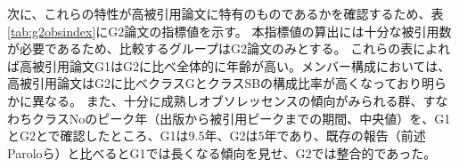 次に、これらの特性が高被引用論文に特有のものであるかを確認するため、表\ref{tab:g2obsindex}にG2論文の指標値を示す。
本指標値の算出には十分な被引用数が必要であるため、比較するグループはG2論文のみとする。
これらの表によれば高被引用論文G1はG2に比べ全体的に年齢が高い。メンバー構成においては、高被引用論文はG2に比べクラスGとクラスSBの構成比率が高くなっており明らかに異なる。
また、十分に成熟しオブソレッセンスの傾向がみられる群、すなわちクラスNoのピーク年（出版から被引用ピークまでの期間、中央値）を、G1とG2とで確認したところ、G1は9.5年、G2は5年であり、既存の報告（前述Paroloら）と比べるとG1では長くなる傾向を見せ、G2では整合的であった。
